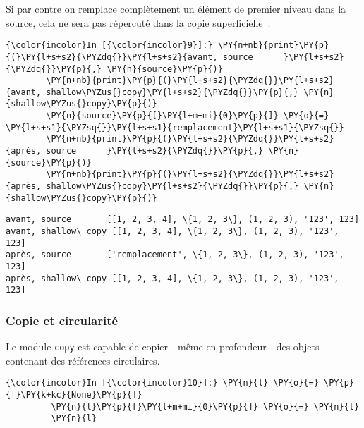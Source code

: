     Si par contre on remplace complètement un élément de premier niveau dans
la source, cela ne sera pas répercuté dans la copie superficielle~:

    \begin{Verbatim}[commandchars=\\\{\},frame=single,framerule=0.3mm,rulecolor=\color{cellframecolor}]
{\color{incolor}In [{\color{incolor}9}]:} \PY{n+nb}{print}\PY{p}{(}\PY{l+s+s2}{\PYZdq{}}\PY{l+s+s2}{avant, source      }\PY{l+s+s2}{\PYZdq{}}\PY{p}{,} \PY{n}{source}\PY{p}{)}
        \PY{n+nb}{print}\PY{p}{(}\PY{l+s+s2}{\PYZdq{}}\PY{l+s+s2}{avant, shallow\PYZus{}copy}\PY{l+s+s2}{\PYZdq{}}\PY{p}{,} \PY{n}{shallow\PYZus{}copy}\PY{p}{)}
        \PY{n}{source}\PY{p}{[}\PY{l+m+mi}{0}\PY{p}{]} \PY{o}{=} \PY{l+s+s1}{\PYZsq{}}\PY{l+s+s1}{remplacement}\PY{l+s+s1}{\PYZsq{}}
        \PY{n+nb}{print}\PY{p}{(}\PY{l+s+s2}{\PYZdq{}}\PY{l+s+s2}{après, source      }\PY{l+s+s2}{\PYZdq{}}\PY{p}{,} \PY{n}{source}\PY{p}{)}
        \PY{n+nb}{print}\PY{p}{(}\PY{l+s+s2}{\PYZdq{}}\PY{l+s+s2}{après, shallow\PYZus{}copy}\PY{l+s+s2}{\PYZdq{}}\PY{p}{,} \PY{n}{shallow\PYZus{}copy}\PY{p}{)}
\end{Verbatim}


    \begin{Verbatim}[commandchars=\\\{\},frame=single,framerule=0.3mm,rulecolor=\color{cellframecolor}]
avant, source       [[1, 2, 3, 4], \{1, 2, 3\}, (1, 2, 3), '123', 123]
avant, shallow\_copy [[1, 2, 3, 4], \{1, 2, 3\}, (1, 2, 3), '123', 123]
après, source       ['remplacement', \{1, 2, 3\}, (1, 2, 3), '123', 123]
après, shallow\_copy [[1, 2, 3, 4], \{1, 2, 3\}, (1, 2, 3), '123', 123]
\end{Verbatim}

    \hypertarget{copie-et-circularituxe9}{%
\subsubsection{Copie et circularité}\label{copie-et-circularituxe9}}

    Le module \texttt{copy} est capable de copier - même en profondeur - des
objets contenant des références circulaires.

    \begin{Verbatim}[commandchars=\\\{\},frame=single,framerule=0.3mm,rulecolor=\color{cellframecolor}]
{\color{incolor}In [{\color{incolor}10}]:} \PY{n}{l} \PY{o}{=} \PY{p}{[}\PY{k+kc}{None}\PY{p}{]}
         \PY{n}{l}\PY{p}{[}\PY{l+m+mi}{0}\PY{p}{]} \PY{o}{=} \PY{n}{l}
         \PY{n}{l}
\end{Verbatim}


